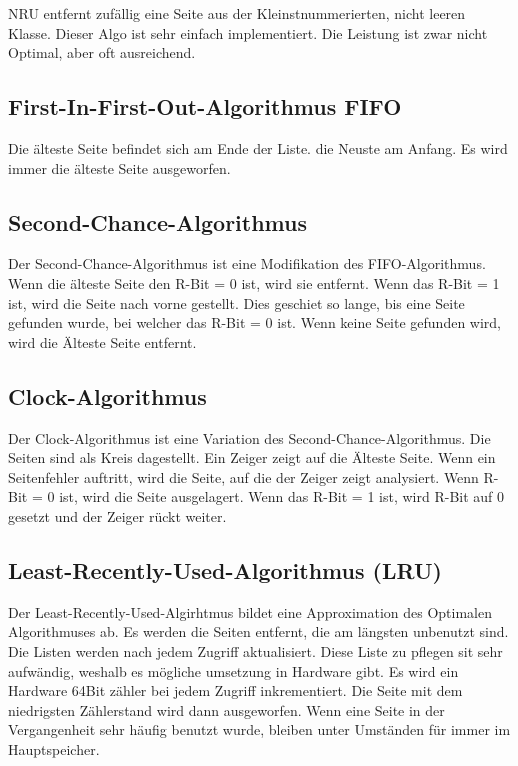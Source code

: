 NRU entfernt zufällig eine Seite aus der Kleinstnummerierten, nicht leeren
Klasse. Dieser Algo ist sehr einfach implementiert. Die Leistung ist zwar nicht
Optimal, aber oft ausreichend.

\subsection{First-In-First-Out-Algorithmus FIFO}

Die älteste Seite befindet sich am Ende der Liste. die Neuste am Anfang. Es
wird immer die älteste Seite ausgeworfen.

\subsection{Second-Chance-Algorithmus}

Der Second-Chance-Algorithmus ist eine Modifikation des FIFO-Algorithmus. Wenn
die älteste Seite den R-Bit = 0 ist, wird sie entfernt. Wenn das R-Bit = 1 ist,
wird die Seite nach vorne gestellt. Dies geschiet so lange, bis eine Seite
gefunden wurde, bei welcher das R-Bit = 0 ist. Wenn keine Seite gefunden wird,
wird die Älteste Seite entfernt.

\subsection{Clock-Algorithmus}

Der Clock-Algorithmus ist eine Variation des Second-Chance-Algorithmus. Die
Seiten sind als Kreis dagestellt. Ein Zeiger zeigt auf die Älteste Seite. Wenn
ein Seitenfehler auftritt, wird die Seite, auf die der Zeiger zeigt analysiert.
Wenn R-Bit = 0 ist, wird die Seite ausgelagert. Wenn das R-Bit = 1 ist, wird
R-Bit auf 0 gesetzt und der Zeiger rückt weiter.

\subsection{Least-Recently-Used-Algorithmus (LRU)}

Der Least-Recently-Used-Algirhtmus bildet eine Approximation des Optimalen
Algorithmuses ab. Es werden die Seiten entfernt, die am längsten unbenutzt
sind. Die Listen werden nach jedem Zugriff aktualisiert. Diese Liste zu pflegen
sit sehr aufwändig, weshalb es mögliche umsetzung in Hardware gibt. Es wird ein
Hardware 64Bit zähler bei jedem Zugriff inkrementiert. Die Seite mit dem
niedrigsten Zählerstand wird dann ausgeworfen. Wenn eine Seite in der
Vergangenheit sehr häufig benutzt wurde, bleiben unter Umständen für immer im
Hauptspeicher.

